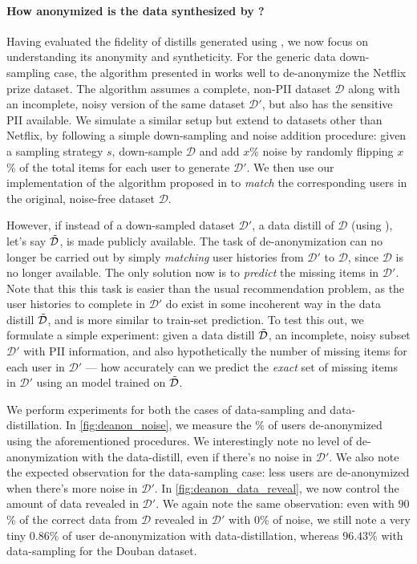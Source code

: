 \documentclass{article}
\begin{document}
\paragraph{How anonymized is the data synthesized by \sampler?} Having evaluated the fidelity of distills generated using \sampler, we now focus on understanding its anonymity and syntheticity. For the generic data down-sampling case, the algorithm presented in \cite{netflix_deanon} works well to de-anonymize the Netflix prize dataset. The algorithm assumes a complete, non-PII dataset $\mathcal{D}$ along with an incomplete, noisy version of the same dataset $\mathcal{D}'$, but also has the sensitive PII available. We simulate a similar setup but extend to datasets other than Netflix, by following a simple down-sampling and noise addition procedure: given a sampling strategy $s$, down-sample $\mathcal{D}$ and add $x$\% noise by randomly flipping $x$\% of the total items for each user to generate $\mathcal{D}'$. We then use our implementation of the algorithm proposed in \cite{netflix_deanon} to \emph{match} the corresponding users in the original, noise-free dataset $\mathcal{D}$. 

However, if instead of a down-sampled dataset $\mathcal{D}'$, a data distill of $\mathcal{D}$ (using \sampler), let's say $\Tilde{\mathcal{D}}$, is made publicly available. The task of de-anonymization can no longer be carried out by simply \emph{matching} user histories from $\mathcal{D}'$ to $\mathcal{D}$, since $\mathcal{D}$ is no longer available. The only solution now is to \emph{predict} the missing items in $\mathcal{D}'$. Note that this this task is easier than the usual recommendation problem, as the user histories to complete in $\mathcal{D}'$ do exist in some incoherent way in the data distill $\Tilde{\mathcal{D}}$, and is more similar to train-set prediction. To test this out, we formulate a simple experiment: given a data distill $\Tilde{\mathcal{D}}$, an incomplete, noisy subset $\mathcal{D}'$ with PII information, and also hypothetically the number of missing items for each user in $\mathcal{D}'$ --- how accurately can we predict the \emph{exact} set of missing items in $\mathcal{D}'$ using an \model model trained on $\Tilde{\mathcal{D}}$.

We perform experiments for both the cases of data-sampling and data-distillation. In \cref{fig:deanon_noise}, we measure the \% of users de-anonymized using the aforementioned procedures. We interestingly note no level of de-anonymization with the data-distill, even if there's no noise in $\mathcal{D}'$. We also note the expected observation for the data-sampling case: less users are de-anonymized when there's more noise in $\mathcal{D}'$. In \cref{fig:deanon_data_reveal}, we now control the amount of data revealed in $\mathcal{D}'$. We again note the same observation: even with $90$\% of the correct data from $\mathcal{D}$ revealed in $\mathcal{D}'$ with $0$\% of noise, we still note a very tiny $0.86$\% of user de-anonymization with data-distillation, whereas $96.43$\% with data-sampling for the Douban dataset.
\end{document}
